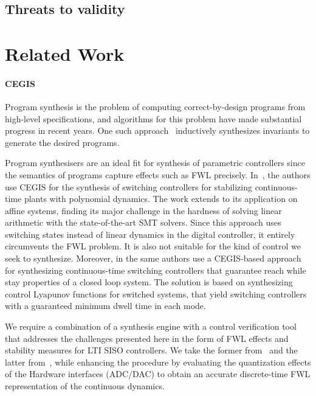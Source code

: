 \documentclass[runningheads,a4paper]{llncs}
\begin{document}
\subsection{Threats to validity}


\section{Related Work}

\paragraph{CEGIS}

Program synthesis is the problem of computing correct-by-design programs
from high-level specifications, and algorithms for this problem have made
substantial progress in recent years.  One such
approach~\cite{itzhaky2010simple} inductively synthesizes invariants to
generate the desired programs.

Program synthesisers are an ideal fit for synthesis of parametric
controllers since the semantics of programs capture effects such as FWL
precisely.  In~\cite{DBLP:conf/cdc/RavanbakhshS15}, the authors use CEGIS
for the synthesis of switching controllers for stabilizing continuous-time
plants with polynomial dynamics.  The work extends to its application on
affine systems, finding its major challenge in the hardness of solving
linear arithmetic with the state-of-the-art SMT solvers.  Since this
approach uses switching states instead of linear dynamics in the digital
controller, it entirely circumvents the FWL problem.  It is also not
suitable for the kind of control we seek to synthesize.
Moreover, in \cite{DBLP:conf/emsoft/RavanbakhshS16} the same authors 
use a CEGIS-based approach for synthesizing continuous-time switching
controllers that guarantee reach while stay properties of a closed
loop system. The solution is based on synthesizing control Lyapunov
functions for switched systems, that yield switching controllers with
a guaranteed minimum dwell time in each mode.

We require a
combination of a synthesis engine with a control verification tool that
addresses the challenges presented here in the form of FWL effects and
stability measures for LTI SISO controllers.  We take the former
from~\cite{DBLP:conf/lpar/DavidKL15} and the latter from~\cite{daes20161},
while enhancing the procedure by evaluating the quantization effects of the
Hardware interfaces (ADC/DAC) to obtain an accurate discrete-time FWL
representation of the continuous dynamics.
\end{document}
